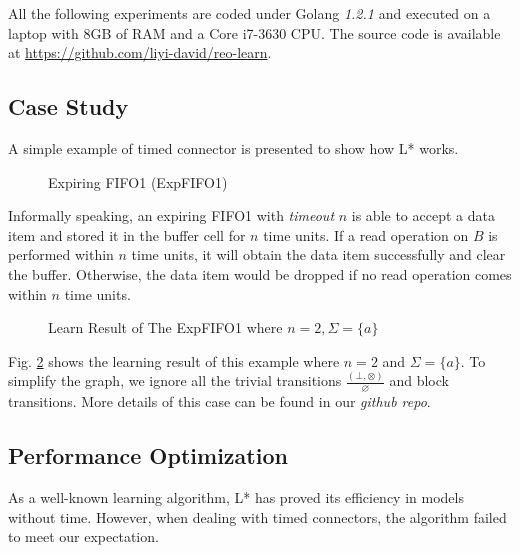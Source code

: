 \documentclass[conference, a4paper]{IEEEtran}
\newcommand{\rnoread}[0]{\otimes}
\newcommand{\rempty}[0]{\varnothing}
\begin{document}
All the following experiments are coded under Golang \emph{1.2.1} and executed on a laptop with 8GB
of RAM and a Core i7-3630 CPU. The source code is available at
\url{https://github.com/liyi-david/reo-learn}.

\subsection{Case Study}
A simple example of timed connector is presented to show how L* works.
\begin{figure}[ht]
  \begin{center}
    
  \end{center}
  \caption{Expiring FIFO1 (ExpFIFO1)}
  \label{fig:expfifo}
\end{figure}

Informally speaking, an expiring FIFO1 with \emph{timeout} $n$ is able to accept a data item
and stored it in the buffer cell for $n$ time units. If a read operation on $B$ is performed within
$n$ time units, it will obtain the data item successfully and clear the buffer. Otherwise, the data
item would be dropped if no read operation comes within $n$ time units.

\begin{figure}[ht]
  \begin{center}
    
  \end{center}
  \caption{Learn Result of The ExpFIFO1 where $n=2,\Sigma=\{a\}$}
  \label{fig:expfifosemantics}
\end{figure}

Fig. \ref{fig:expfifosemantics} shows the learning result of this example where $n=2$ and
$\Sigma=\{a\}$.
To simplify the graph, we ignore all the trivial transitions $\frac{(\bot,\rnoread)}{\rempty}$
and block transitions. More details of this case can be found in our \emph{github repo}.

\subsection{Performance Optimization}
As a well-known learning algorithm, L* has proved its efficiency in models without time.
However, when dealing with timed connectors, the algorithm failed to meet our expectation.
\end{document}
